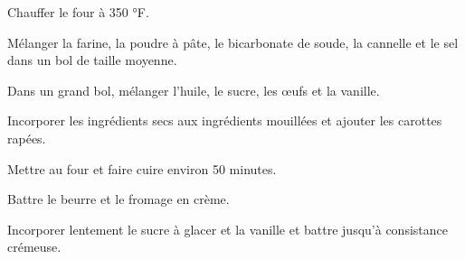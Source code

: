 \begin{steps}
    \item[] 
    \item Chauffer le four à 350 °F.
    \item Mélanger la farine, la poudre à pâte, le bicarbonate de soude, la cannelle et le sel dans un bol de taille moyenne.
    \item Dans un grand bol, mélanger l'huile, le sucre, les œufs et la vanille.
    \item Incorporer les ingrédients secs aux ingrédients mouillées et ajouter les carottes rapées.
    \item Mettre au four et faire cuire environ 50 minutes.
    \\
    \item[] 
    \item Battre le beurre et le fromage en crème.
    \item Incorporer lentement le sucre à glacer et la vanille et battre jusqu'à consistance crémeuse.
\end{steps}
